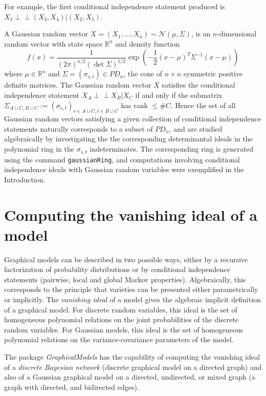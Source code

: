 \documentclass[letterpaper]{article}
\theoremstyle{definition}
\def\ci{\perp\!\!\!\perp}
\begin{document}
For example, the first conditional independence statement produced
is $X_{1} \ci (X_{3}, X_{4}) | (X_{2}, X_{5})$.

A Gaussian random vector $X = (X_{1}, \ldots, X_{n}) 
\sim \mathcal{N}(\mu, \Sigma)$, is an
$n$-dimensional random vector with state space $\mathbb{R}^{n}$ and
density function
$$
f(x)  =  \frac{1}{(2 \pi)^{n/2}(\det \Sigma)^{1/2} } 
\exp\left( - \frac{1}{2} (x- \mu)^{T} \Sigma^{{-1}} (x - \mu) \right)
$$
where $\mu \in \mathbb{R}^{n}$ and $\Sigma = (\sigma_{s,t}) \in PD_{n}$, the cone of 
$n \times n$ symmetric positive definite matrices.  The Gaussian random vector
$X$ satisfies the conditional independence statement $X_{A} \ci X_{B} | X_{C}$
if and only if the submatrix 
$\Sigma_{A \cup C, B \cup C}  := 
(\sigma_{s,t})_{s \in A \cup C, t \in B \cup C}$ has rank $\leq \#C$.
Hence the set of all Gaussian random vectors satisfying a given
collection of conditional independence statements naturally corresponds
to a subset of $PD_{n}$, and are studied algebraically by investigating the
the corresponding determinantal ideals in the polynomial ring
in the $\sigma_{s,t}$ indeterminates.  The corresponding ring
is generated using the command {\tt gaussianRing}, and
computations involving conditional independence ideals with
Gaussian random variables were exemplified in the Introduction.



      



\section{Computing the vanishing ideal of a model}

Graphical models can be described in two possible ways, either by a recursive
factorization of probability distributions or by conditional independence
statements (pairwise, local and global Markov properties). Algebraically, this
corresponds to the principle that varieties can be presented either
parametrically or implicitly. The \emph{vanishing ideal} of a model 
gives the algebraic implicit definition of a graphical model. For discrete
random variables, this ideal is the set 
of homogeneous polynomial relations on the joint probabilities of  the discrete
random variables. For Gaussian models, this ideal is the set  of homogeneous
polynomial relations on the variance-covariance parameters of the model.

The package \textit{GraphicalModels} has the capability of computing the vanishing ideal
of  a \emph{discrete Bayesian network} (discrete graphical model on a directed
graph) and also of a Gaussian graphical model on a directed, undirected, or  mixed
graph (a graph with directed, and bidirected edges). 
\end{document}
